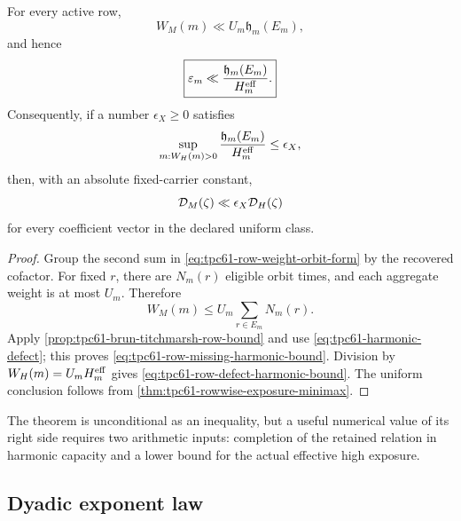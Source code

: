 \begin{theorem}
\label{thm:tpc61-harmonic-defect-bound}
For every active row,
\begin{equation}
 \boxed{
 W_M(m)\ll U_m\mathfrak h_m(E_m),}
 \label{eq:tpc61-row-missing-harmonic-bound}
\end{equation}
and hence
\begin{equation}
 \boxed{
 \varepsilon_m
 \ll\frac{\mathfrak h_m(E_m)}{H_m^{\rm eff}}.}
 \label{eq:tpc61-row-defect-harmonic-bound}
\end{equation}
Consequently, if a number \(\epsilon_X\ge0\) satisfies
\begin{equation}
 \sup_{m:W_H(m)>0}
 \frac{\mathfrak h_m(E_m)}{H_m^{\rm eff}}
 \le\epsilon_X,
 \label{eq:tpc61-uniform-harmonic-hypothesis}
\end{equation}
then, with an absolute fixed-carrier constant,
\begin{equation}
 \mathcal D_M(\zeta)\ll\epsilon_X\mathcal D_H(\zeta)
 \label{eq:tpc61-uniform-harmonic-transfer}
\end{equation}
for every coefficient vector in the declared uniform class.
\end{theorem}

\begin{proof}
Group the second sum in \eqref{eq:tpc61-row-weight-orbit-form} by the
recovered cofactor.  For fixed \(r\), there are \(N_m(r)\) eligible orbit
times, and each aggregate weight is at most \(U_m\).  Therefore
\begin{equation}
 W_M(m)
 \le U_m\sum_{r\in E_m}N_m(r).
 \label{eq:tpc61-WM-before-BT}
\end{equation}
Apply \cref{prop:tpc61-brun-titchmarsh-row-bound} and use
\eqref{eq:tpc61-harmonic-defect}; this proves
\eqref{eq:tpc61-row-missing-harmonic-bound}.  Division by
\(W_H(m)=U_mH_m^{\rm eff}\) gives
\eqref{eq:tpc61-row-defect-harmonic-bound}.  The uniform conclusion follows
from \cref{thm:tpc61-rowwise-exposure-minimax}.
\end{proof}

The theorem is unconditional as an inequality, but a useful numerical
value of its right side requires two arithmetic inputs: completion of the
retained relation in harmonic capacity and a lower bound for the actual
effective high exposure.

\subsection{Dyadic exponent law}

